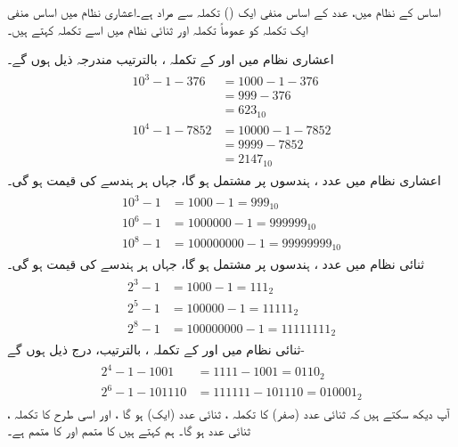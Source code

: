 اساس   کے نظام    میں،    عدد  کے اساس منفی ایک () تکملہ  سے مراد     ہے۔اعشاری نظام میں اساس منفی ایک  تکملہ کو عموماً تکملہ      اور ثنائی نظام  میں اسے   تکملہ   کہتے ہیں۔
 
اعشاری نظام میں    اور    کے تکملہ ،  بالترتیب   مندرجہ ذیل ہوں گے۔ 
\begin{gather}
\begin{aligned}
10^3-1-376&=1000-1-376\\
&=999-376\\
&=623_{10}\\
10^4-1-7852&=10000-1-7852\\
&=9999-7852\\
&=2147_{10}
\end{aligned}
\end{gather}
اعشاری نظام میں عدد    ،      ہندسوں پر مشتمل ہو گا،  جہاں ہر ہندسے کی قیمت    ہو گی۔
\begin{gather}
\begin{aligned}
10^3-1&=1000-1=999_{10}\\
10^6-1&=1000000-1=999999_{10}\\
10^8-1&=100000000-1=99999999_{10}
\end{aligned}
\end{gather}
ثنائی  نظام میں عدد    ،      ہندسوں پر مشتمل ہو گا،  جہاں ہر ہندسے کی قیمت    ہو گی۔
\begin{gather}
\begin{aligned}
2^3-1&=1000-1=111_{2}\\
2^5-1&=100000-1=11111_{2}\\
2^8-1&=100000000-1=11111111_{2}
\end{aligned}
\end{gather}
 ثنائی نظام میں   اور      کے تکملہ ، بالترتیب، درج ذیل ہوں گے- 
\begin{gather}
\begin{aligned}
2^4-1-1001&=1111-1001=0110_2\\
2^6-1-101110&=111111-101110=010001_2
\end{aligned}
\end{gather}
آپ دیکھ سکتے ہیں کہ ثنائی عدد  (صفر)  کا تکملہ ،  ثنائی عدد  (ایک) ہو گا  ، اور اسی طرح  کا تکملہ ،  ثنائی عدد  ہو گا۔ ہم کہتے ہیں  کا متمم  اور  کا متمم  ہے۔

